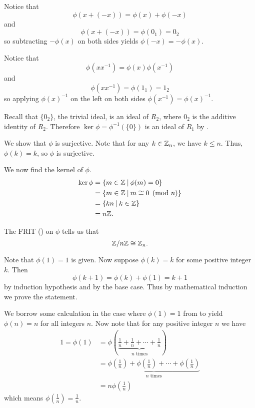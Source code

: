 \begin{questions}
    \item \begin{partquestions}{\alph*}
        \item Notice that
        \[
            \phi(x + (-x)) = \phi(x) + \phi(-x)
        \]
        and
        \[
            \phi(x + (-x)) = \phi(0_1) = 0_2
        \]
        so subtracting $-\phi(x)$ on both sides yields $\phi(-x) = -\phi(x)$.

        \item Notice that
        \[
            \phi(xx^{-1}) = \phi(x)\phi(x^{-1})
        \]
        and
        \[
            \phi(xx^{-1}) = \phi(1_1) = 1_2
        \]
        so applying $\phi(x)^{-1}$ on the left on both sides $\phi(x^{-1}) = \phi(x)^{-1}$.
    \end{partquestions}

    \item Recall that $\{0_2\}$, the trivial ideal, is an ideal of $R_2$, where $0_2$ is the additive identity of $R_2$. Therefore $\ker\phi = \phi^{-1}(\{0\})$ is an ideal of $R_1$ by .

    \item We show that $\phi$ is surjective. Note that for any $k \in \mathbb{Z}_n$, we have $k \leq n$. Thus, $\phi(k) = k$, so $\phi$ is surjective.
    
    We now find the kernel of $\phi$.
    \begin{align*}
        \ker\phi &= \{m \in \Z \vert \phi(m) = 0\}\\
        &= \{m \in \Z \vert m \cong 0 \pmod n\}\\
        &= \{kn \vert k \in \Z\}\\
        &= n\Z.
    \end{align*}

    The FRIT () on $\phi$ tells us that
    \[
        \mathbb{Z}/n\mathbb{Z} \cong \mathbb{Z}_n.
    \]

    \item Note that $\phi(1) = 1$ is given. Now suppose $\phi(k) = k$ for some positive integer $k$. Then
    \[
        \phi(k+1) = \phi(k) + \phi(1) = k + 1
    \]
    by induction hypothesis and by the base case. Thus by mathematical induction we prove the statement.

    \item We borrow some calculation in the case where $\phi(1) = 1$ from  to yield $\phi(n) = n$ for all integers $n$. Now note that for any positive integer $n$ we have
    \begin{align*}
        1 = \phi(1) &= \phi\left(\underbrace{\frac1n + \frac1n + \cdots + \frac1n}_{n \text{ times}}\right)\\
        &= \underbrace{\phi\left(\frac1n\right) + \phi\left(\frac1n\right) + \cdots + \phi\left(\frac1n\right)}_{n \text{ times}}\\
        &= n\phi\left(\frac1n\right)
    \end{align*}
    which means $\phi\left(\frac1n\right) = \frac1n$.


\end{questions}
